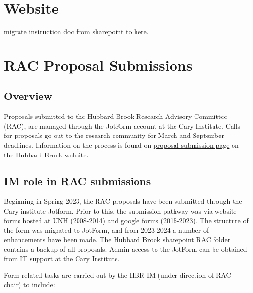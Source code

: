 \documentclass[
  letterpaper,
  DIV=11,
  numbers=noendperiod]{scrreprt}
\begin{document}

\chapter{}\label{section}


\chapter{Website}\label{website-1}

migrate instruction doc from sharepoint to here.


\chapter{RAC Proposal Submissions}\label{rac-proposal-submissions}

\section{Overview}\label{overview-6}

Proposals submitted to the Hubbard Brook Research Advisory Committee
(RAC), are managed through the JotForm account at the Cary Institute.
Calls for proposals go out to the research community for March and
September deadlines. Information on the process is found on
\href{https://hubbardbrook.org/research-proposal-submission/}{proposal
submission page} on the Hubbard Brook website.

\section{IM role in RAC submissions}\label{im-role-in-rac-submissions}

Beginning in Spring 2023, the RAC proposals have been submitted through
the Cary institute Jotform. Prior to this, the submission pathway was
via website forms hosted at UNH (2008-2014) and google forms
(2015-2023). The structure of the form was migrated to JotForm, and from
2023-2024 a number of enhancements have been made. The Hubbard Brook
sharepoint RAC folder contains a backup of all proposals. Admin access
to the JotForm can be obtained from IT support at the Cary Institute.

Form related tasks are carried out by the HBR IM (under direction of RAC
chair) to include:
\end{document}
